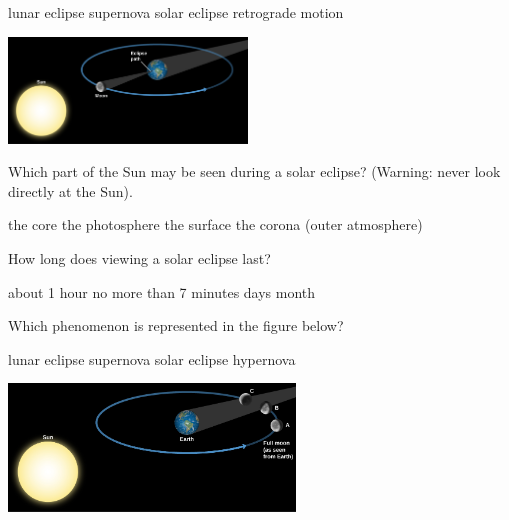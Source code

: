 \documentclass[addpoints]{exam}
\begin{document}
\begin{questions}
\begin{minipage}{0.4\textwidth}
    \centering
    \begin{choices}
    \choice lunar eclipse
    \choice supernova
    \correctchoice solar eclipse
    \choice retrograde motion
    \end{choices}
\end{minipage}%
\begin{minipage}{0.5\textwidth}
    \centering
    \includegraphics[width=2.5in]{Figures/Figure4.22.jpg}
\end{minipage}
\vspace{1em}

\question
Which part of the Sun may be seen during a solar eclipse? (Warning: never look directly at the Sun).

\begin{choices}
    \choice the core
    \choice the photosphere
    \choice the surface
    \correctchoice the corona (outer atmosphere)
\end{choices}

\question
How long does viewing a solar eclipse last?

\begin{choices}
    \choice about 1 hour
    \correctchoice no more than 7 minutes
     days
     month
\end{choices}

\question
Which phenomenon is represented in the figure below?
\vspace{1em}

\begin{minipage}{0.4\textwidth}
    \centering
    \begin{choices}
    \correctchoice lunar eclipse
    \choice supernova
    \choice solar eclipse
    \choice hypernova
    \end{choices}
\end{minipage}%
\begin{minipage}{0.5\textwidth}
    \centering
    \includegraphics[width=3in]{Figures/Figure4.24.jpg}
\end{minipage}


\end{questions}
\end{document}

